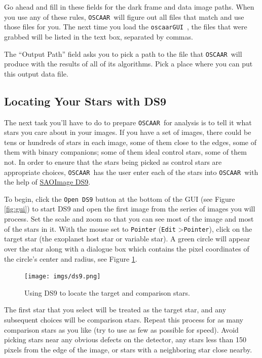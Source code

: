 \documentclass[a4paper]{article}
\newcommand{\code}[1]{\texttt{#1}}
\newcommand{\oscaar}{\code{OSCAAR}~}
\newcommand{\gui}{\code{oscaarGUI}~}
\begin{document}
Go ahead and fill in these fields for the dark frame and data image paths. When you use any of these rules, \oscaar will figure out all files that match and use those files for you. The next time you load the \gui, the files that were grabbed will be listed in the text box, separated by commas. 

The ``Output Path'' field asks you to pick a path to the file that \oscaar will produce with the results of all of its algorithms. Pick a place where you can put this output data file.

\subsection{Locating Your Stars with DS9} \label{sec:locatingStars}

The next task you'll have to do to prepare \oscaar for analysis is to tell it what stars you care about in your images. If you have a set of images, there could be tens or hundreds of stars in each image, some of them close to the edges, some of them with binary companions; some of them ideal control stars, some of them not. In order to ensure that the stars being picked as control stars are appropriate choices, \oscaar has the user enter each of the stars into \oscaar with the help of \href{http://hea-www.harvard.edu/RD/ds9/site/Home.html}{SAOImage DS9}. 

To begin, click the \code{Open DS9} button at the bottom of the GUI (see Figure \ref{fig:gui}) to start DS9 and open the first image from the series of images you will process. Set the scale and zoom so that you can see most of the image and most of the stars in it. With the mouse set to \code{Pointer} (\code{Edit} \textgreater  \code{Pointer}), click on the target star (the exoplanet host star or variable star). A green circle will appear over the star along with a dialogue box which contains the pixel coordinates of the circle's center and radius, see Figure \ref{fig:ds9}. 
\begin{figure}[H]
\begin{center}
\texttt{[image: imgs/ds9.png]}
\caption{Using DS9 to locate the target and comparison stars.}
\label{fig:ds9}
\end{center}	
\end{figure}
The first star that you select will be treated as the target star, and any subsequent choices will be comparison stars. Repeat this process for as many comparison stars as you like (try to use as few as possible for speed). Avoid picking stars near any obvious defects on the detector, any stars less than 150 pixels from the edge of the image, or stars with a neighboring star close nearby. 
\end{document}
